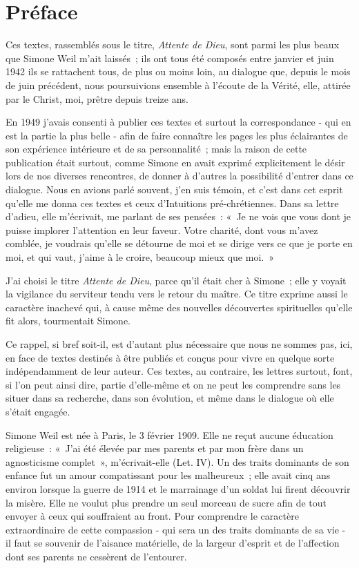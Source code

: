 \documentclass[french,twoside]{book} %
\newcommand{\byline}[1]{\bigskip{\RaggedLeft{#1}\par}\bigskip}
\newcommand\chapteropen{} %
\newcommand\chaptercont{} %
\begin{document}
\chapteropen
\chapter[Préface]{Préface}\renewcommand{\leftmark}{Préface}


\byline{Par J.-M. Perrin}

\chaptercont
\noindent Ces textes, rassemblés sous le titre, {\itshape Attente de Dieu}, sont parmi les plus beaux que Simone Weil m'ait laissés ; ils ont tous été composés entre janvier et juin 1942 ils se rattachent tous, de plus ou moins loin, au dialogue que, depuis le mois de juin précédent, nous poursuivions ensemble à l'écoute de la Vérité, elle, attirée par le Christ, moi, prêtre depuis treize ans.\par
En 1949 j'avais consenti à publier ces textes et surtout la correspondance - qui en est la partie la plus belle - afin de faire connaître les pages les plus éclairantes de son expérience intérieure et de sa personnalité ; mais la raison de cette publication était surtout, comme Simone en avait exprimé explicitement le désir lors de nos diverses rencontres, de donner à d'autres la possibilité d'entrer dans ce dialogue. Nous en avions parlé souvent, j'en suis témoin, et c'est dans cet esprit qu'elle me donna ces textes et ceux d'Intuitions pré-chrétiennes. Dans sa lettre d'adieu, elle m'écrivait, me parlant de ses pensées : « Je ne vois que vous dont je puisse implorer l'attention en leur faveur. Votre charité, dont vous m'avez comblée, je voudrais qu'elle se détourne de moi et se dirige vers ce que je porte en moi, et qui vaut, j'aime à le croire, beaucoup mieux que moi. »\par
J'ai choisi le titre {\itshape Attente de Dieu}, parce qu'il était cher à Simone ; elle y voyait la vigilance du serviteur tendu vers le retour du maître. Ce titre exprime aussi le caractère inachevé qui, à cause même des nouvelles découvertes spirituelles qu'elle fit alors, tourmentait Simone.\par
Ce rappel, si bref soit-il, est d'autant plus nécessaire que nous ne sommes pas, ici, en face de textes destinés à être publiés et conçus pour vivre en quelque sorte indépendamment de leur auteur. Ces textes, au contraire, les lettres surtout, font, si l'on peut ainsi dire, partie d'elle-même et on ne peut les comprendre sans les situer dans sa recherche, dans son évolution, et même dans le dialogue où elle s'était engagée.\par
Simone Weil est née à Paris, le 3 février 1909. Elle ne reçut aucune éducation religieuse : « J'ai été élevée par mes parents et par mon frère dans un agnosticisme complet », m'écrivait-elle (Let. IV). Un des traits dominants de son enfance fut un amour compatissant pour les malheureux ; elle avait cinq ans environ lorsque la guerre de 1914 et le marrainage d'un soldat lui firent découvrir la misère. Elle ne voulut plus prendre un seul morceau de sucre afin de tout envoyer à ceux qui souffraient au front. Pour comprendre le caractère extraordinaire de cette compassion - qui sera un des traits dominants de sa vie - il faut se souvenir de l'aisance matérielle, de la largeur d'esprit et de l'affection dont ses parents ne cessèrent de l'entourer.\par
\end{document}
